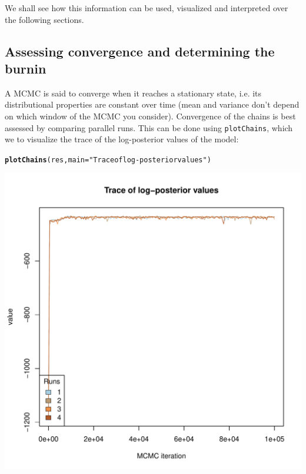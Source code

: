 \documentclass{article}\usepackage[]{graphicx}\usepackage[]{color}
\makeatletter
\newcommand{\hlstr}[1]{\textcolor[rgb]{0.192,0.494,0.8}{#1}}%
\newcommand{\hlstd}[1]{\textcolor[rgb]{0.345,0.345,0.345}{#1}}%
\newcommand{\hlkwc}[1]{\textcolor[rgb]{0.333,0.667,0.333}{#1}}%
\newcommand{\hlkwd}[1]{\textcolor[rgb]{0.737,0.353,0.396}{\textbf{#1}}}%
\newenvironment{kframe}{%
 \def\at@end@of@kframe{}%
 \ifinner\ifhmode%
  \def\at@end@of@kframe{\end{minipage}}%
  \begin{minipage}{\columnwidth}%
 \fi\fi%
 \def\FrameCommand##1{\hskip\@totalleftmargin \hskip-\fboxsep
 \colorbox{shadecolor}{##1}\hskip-\fboxsep
     \hskip-\linewidth \hskip-\@totalleftmargin \hskip\columnwidth}%
 \MakeFramed {\advance\hsize-\width
   \@totalleftmargin\z@ \linewidth\hsize
   \@setminipage}}%
 {\par\unskip\endMakeFramed%
 \at@end@of@kframe}
\newenvironment{knitrout}{}{} %
\makeatother
\begin{document}
We shall see how this information can be used, visualized and interpreted over the following sections.




\subsection{Assessing convergence and determining the burnin}

A MCMC is said to converge when it reaches a stationary state, i.e. its distributional properties are
constant over time (mean and variance don't depend on which window of the MCMC you consider).
Convergence of the chains is best assessed by comparing parallel runs.
This can be done using \texttt{plotChains}, which we to visualize the trace of the log-posterior
values of the model:
\begin{knitrout}
\color{fgcolor}\begin{kframe}
\begin{alltt}
\hlkwd{plotChains}\hlstd{(res,} \hlkwc{main}\hlstd{=}\hlstr{"Trace of log-posterior values"}\hlstd{)}
\end{alltt}
\end{kframe}

{\centering \includegraphics[width=.6\textwidth]{figs/unnamed-chunk-10} 

}



\end{knitrout}
\end{document}
